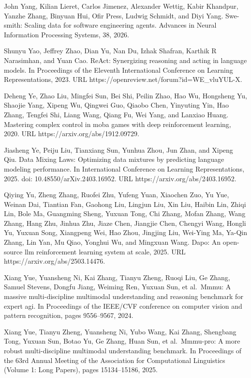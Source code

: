 John Yang, Kilian Lieret, Carlos Jimenez, Alexander Wettig, Kabir
Khandpur, Yanzhe Zhang, Binyuan Hui, Ofir Press, Ludwig Schmidt, and
Diyi Yang. Swe-smith: Scaling data for software engineering agents.
Advances in Neural Information Processing Systems, 38, 2026.

Shunyu Yao, Jeffrey Zhao, Dian Yu, Nan Du, Izhak Shafran, Karthik R
Narasimhan, and Yuan Cao. ReAct: Synergizing reasoning and acting in
language models. In Proceedings of the Eleventh International Conference
on Learning Representations, 2023. URL
https://openreview.net/forum?id=WE\_vluYUL-X.

Deheng Ye, Zhao Liu, Mingfei Sun, Bei Shi, Peilin Zhao, Hao Wu,
Hongsheng Yu, Shaojie Yang, Xipeng Wu, Qingwei Guo, Qiaobo Chen,
Yinyuting Yin, Hao Zhang, Tengfei Shi, Liang Wang, Qiang Fu, Wei Yang,
and Lanxiao Huang. Mastering complex control in moba games with deep
reinforcement learning, 2020. URL https://arxiv.org/abs/1912.09729.

Jiasheng Ye, Peiju Liu, Tianxiang Sun, Yunhua Zhou, Jun Zhan, and Xipeng
Qiu. Data Mixing Laws: Optimizing data mixtures by predicting language
modeling performance. In International Conference on Learning
Representations, 2025. doi: 10.48550/arXiv.2403.16952. URL
https://arxiv.org/abs/2403.16952.

Qiying Yu, Zheng Zhang, Ruofei Zhu, Yufeng Yuan, Xiaochen Zuo, Yu Yue,
Weinan Dai, Tiantian Fan, Gaohong Liu, Lingjun Liu, Xin Liu, Haibin Lin,
Zhiqi Lin, Bole Ma, Guangming Sheng, Yuxuan Tong, Chi Zhang, Mofan
Zhang, Wang Zhang, Hang Zhu, Jinhua Zhu, Jiaze Chen, Jiangjie Chen,
Chengyi Wang, Hongli Yu, Yuxuan Song, Xiangpeng Wei, Hao Zhou, Jingjing
Liu, Wei-Ying Ma, Ya-Qin Zhang, Lin Yan, Mu Qiao, Yonghui Wu, and
Mingxuan Wang. Dapo: An open-source llm reinforcement learning system at
scale, 2025. URL https://arxiv.org/abs/2503.14476.

Xiang Yue, Yuansheng Ni, Kai Zhang, Tianyu Zheng, Ruoqi Liu, Ge Zhang,
Samuel Stevens, Dongfu Jiang, Weiming Ren, Yuxuan Sun, et al.~Mmmu: A
massive multi-discipline multimodal understanding and reasoning
benchmark for expert agi. In Proceedings of the IEEE/CVF conference on
computer vision and pattern recognition, pages 9556--9567, 2024.

Xiang Yue, Tianyu Zheng, Yuansheng Ni, Yubo Wang, Kai Zhang, Shengbang
Tong, Yuxuan Sun, Botao Yu, Ge Zhang, Huan Sun, et al.~Mmmu-pro: A more
robust multi-discipline multimodal understanding benchmark. In
Proceedings of the 63rd Annual Meeting of the Association for
Computational Linguistics (Volume 1: Long Papers), pages 15134--15186,
2025.

